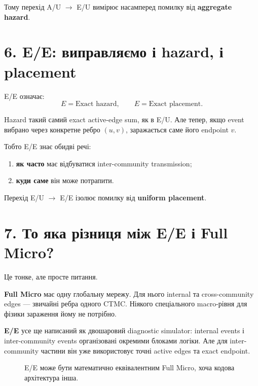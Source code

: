 \documentclass[11pt,a4paper]{article}
\begin{document}
Тому перехід A/U $\to$ E/U вимірює насамперед помилку від \textbf{aggregate hazard}.

\section*{6. E/E: виправляємо і hazard, і placement}

E/E означає:
\[
 \boxed{E=\text{Exact hazard}},\qquad
 \boxed{E=\text{Exact placement}}.
\]

Hazard такий самий exact active-edge sum, як в E/U. Але тепер, якщо event вибрано через конкретне ребро $(u,v)$, заражається саме його endpoint $v$.

Тобто E/E знає обидві речі:
\begin{enumerate}[nosep]
\item \textbf{як часто} має відбуватися inter-community transmission;
\item \textbf{куди саме} він може потрапити.
\end{enumerate}

Перехід E/U $\to$ E/E ізолює помилку від \textbf{uniform placement}.

\section*{7. То яка різниця між E/E і Full Micro?}

Це тонке, але просте питання.

\textbf{Full Micro} має одну глобальну мережу. Для нього internal та cross-community edges --- звичайні ребра одного CTMC. Ніякого спеціального macro-рівня для фізики зараження йому не потрібно.

\textbf{E/E} усе ще написаний як двошаровий diagnostic simulator: internal events і inter-community events організовані окремими блоками логіки. Але для inter-community частини він уже використовує точні active edges та exact endpoint.

\begin{figure}[h!]
\centering
{}
\caption{E/E може бути математично еквівалентним Full Micro, хоча кодова архітектура інша.}
\end{figure}
\end{document}

